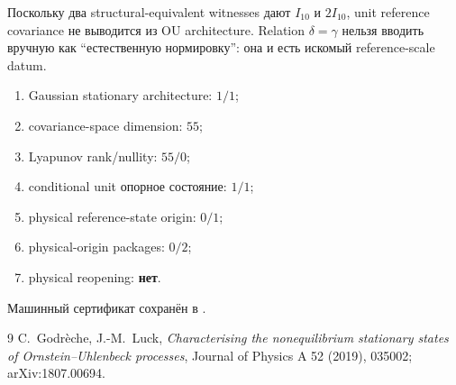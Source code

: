 \begin{nogocriterion}
Поскольку два structural-equivalent witnesses дают $I_{10}$ и $2I_{10}$,
unit reference covariance не выводится из OU architecture. Relation
$\delta=\gamma$ нельзя вводить вручную как ``естественную нормировку'':
она и есть искомый reference-scale datum.
\end{nogocriterion}

\begin{protocol}\begin{enumerate}
\item Gaussian stationary architecture: \textbf{$1/1$};
\item covariance-space dimension: \textbf{$55$};
\item Lyapunov rank/nullity: \textbf{$55/0$};
\item conditional unit опорное состояние: \textbf{$1/1$};
\item physical reference-state origin: \textbf{$0/1$};
\item physical-origin packages: \textbf{$0/2$};
\item physical reopening: \textbf{нет}.
\end{enumerate}\end{protocol}

Машинный сертификат сохранён в
.

\begin{thebibliography}{9}
C.~Godr\`eche, J.-M.~Luck,
\emph{Characterising the nonequilibrium stationary states of
Ornstein--Uhlenbeck processes}, Journal of Physics A 52 (2019), 035002;
arXiv:1807.00694.
\end{thebibliography}